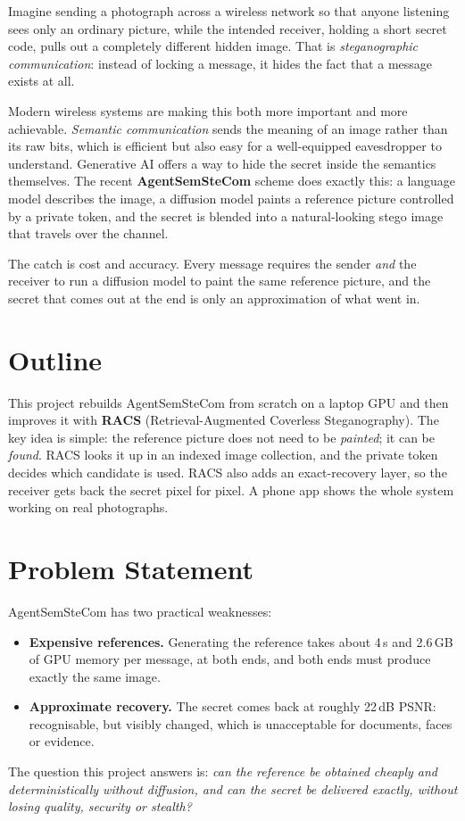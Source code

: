 \par Imagine sending a photograph across a wireless network so that anyone listening sees only
an ordinary picture, while the intended receiver, holding a short secret code, pulls out a
completely different hidden image. That is \emph{steganographic communication}: instead of
locking a message, it hides the fact that a message exists at all.

Modern wireless systems are making this both more important and more achievable.
\emph{Semantic communication} sends the meaning of an image rather than its raw bits, which is
efficient but also easy for a well-equipped eavesdropper to understand. Generative AI offers a
way to hide the secret inside the semantics themselves. The recent \textbf{AgentSemSteCom}
scheme \cite{meng2026agentsemstecom} does exactly this: a language model describes the image,
a diffusion model paints a reference picture controlled by a private token, and the secret is
blended into a natural-looking stego image that travels over the channel.

The catch is cost and accuracy. Every message requires the sender \emph{and} the receiver to
run a diffusion model to paint the same reference picture, and the secret that comes out at
the end is only an approximation of what went in.

\section{Outline}
This project rebuilds AgentSemSteCom from scratch on a laptop GPU and then improves it with
\textbf{RACS} (Retrieval-Augmented Coverless Steganography). The key idea is simple: the
reference picture does not need to be \emph{painted}; it can be \emph{found}. RACS looks it up
in an indexed image collection, and the private token decides which candidate is used. RACS
also adds an exact-recovery layer, so the receiver gets back the secret pixel for pixel. A
phone app shows the whole system working on real photographs.

\section{Problem Statement}
AgentSemSteCom has two practical weaknesses:
\begin{itemize}
	\item \textbf{Expensive references.} Generating the reference takes about 4\,s and 2.6\,GB of
	GPU memory per message, at both ends, and both ends must produce exactly the same image.
	\item \textbf{Approximate recovery.} The secret comes back at roughly 22\,dB PSNR: recognisable,
	but visibly changed, which is unacceptable for documents, faces or evidence.
\end{itemize}
The question this project answers is: \emph{can the reference be obtained cheaply and
deterministically without diffusion, and can the secret be delivered exactly, without losing
quality, security or stealth?}

